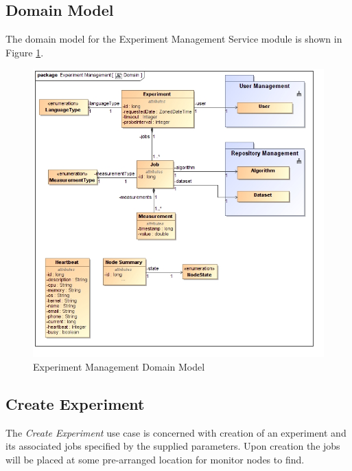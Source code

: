 \subsection{Domain Model}
The domain model for the Experiment Management Service module is shown in Figure \ref{fig:experimentManagementDomain}.
\begin{figure}[H]
  \begin{center}
  \includegraphics[scale=0.38]{../Diagrams and Charts/Experiment/Domain.jpg}
  \caption{Experiment Management Domain Model}
  \label{fig:experimentManagementDomain}
  \end{center}
\end{figure}



\subsection {Create Experiment}
The \textit{Create Experiment} use case is concerned with creation of an
experiment and its associated jobs specified by the supplied parameters. Upon
creation the jobs will be placed at some pre-arranged location for monitor nodes
to find.

